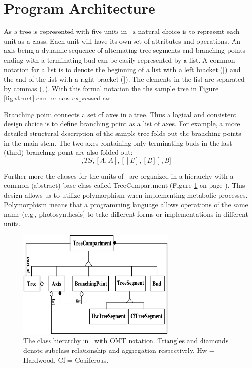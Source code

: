 \section{Program Architecture}

As a tree is represented with five units  in \lignum\ a natural choice
is to represent each unit as a class.  Each unit will have its own set
of attributes  and operations.  An axis  being  a dynamic  sequence of
alternating tree  segments   and  branching   points  ending  with   a
terminating  bud  can  be easily   represented by a   list.  A  common
notation for a list is  to denote the beginning  of a list with a left
bracket ($[$) and the end of the list with  a right bracket ($]$). The
elements in the list are separated by  commas ($,$).  With this formal
notation  the the  sample tree  in Figure \ref{fig:struct}  can be now
expressed as:
\begin{displaymath}
[TS,BP,TS,BP,TS,BP,B]
\end{displaymath}

Branching point connects a set of axes in a tree.   Thus a logical and
consistent design  choice is  to define branching  point  as a list of
axes.  For example, a   more detailed  structural description  of  the
sample tree  folds out the branching points  in the main stem. The two
axes containing only terminating   buds in the last (third)  branching
point are also folded out:
\begin{displaymath}
[TS,[A,A],TS,[A,A],[[B],[B]],B]
\end{displaymath}
 
Further more the classes for the units of \lignum\  are organized in a
hierarchy with a common (abstract)  base class called  TreeCompartment
(Figure \ref{fig:omt} on page  \pageref{fig:omt}).  This design allows
us to  utilize  polymorphism  when  implementing metabolic  processes.
Polymorphism means that  a  programming language allows operations  of
the   same name (e.g.,  photosynthesis)   to  take different forms  or
implementations in different units.

\begin{figure}[h]
\begin{center}
\includegraphics[width=0.7\textwidth,height=0.5\textwidth]{lignum-classes}
\caption{\label{fig:omt} The class hierarchy in \lignum\ with OMT
notation. Triangles and diamonds denote subclass relationship and 
aggregation respectively. Hw = Hardwood, Cf = Coniferous.}
\end{center}
\end{figure}

